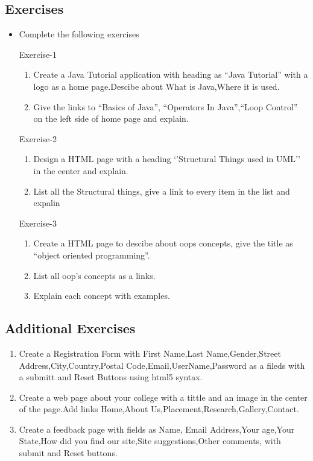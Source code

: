 \documentclass[11pt,a4paper]{article}
\begin{document}
\subsection*{Exercises}
\begin{itemize}
\item Complete the following  exercises

\item[Exercise-1]\
\begin{enumerate}[label=\bfseries Q\arabic*:]\itemsep10pt
\item Create a Java Tutorial application with heading as ``Java Tutorial'' with a logo as a home page.Descibe about What is Java,Where it is used.
\item Give the links to ``Basics of Java'', ``Operators In Java'',``Loop Control'' on the left side of home page and explain.
\end{enumerate}

\item[Exercise-2]\
\begin{enumerate}[label=\bfseries Q\arabic*:]\itemsep10pt
\item Design a HTML page with a heading `'Structural Things used in UML'' in the center and explain.
\item List all the Structural things, give a link to every item in the list and expalin 
\end{enumerate}

\item[Exercise-3]\
\begin{enumerate}[label=\bfseries Q\arabic*:]\itemsep10pt
\item Create a HTML page to descibe about oops concepts, give the title as ``object oriented programming''.
\item List all oop's concepts as a links.
\item Explain each concept with examples.
\end{enumerate}

\end{itemize}

\subsection*{Additional Exercises}
\begin{enumerate}
\item Create a Registration Form with First Name,Last Name,Gender,Street Address,City,Country,Postal Code,Email,UserName,Password as a fileds with a submitt and Reset Buttons using html5 syntax.
\item Create a web page about your college with a tittle and an image in the center of the page.Add links Home,About Us,Placement,Research,Gallery,Contact. 
\item Create a feedback page with fields as Name, Email Address,Your age,Your State,How did you find our site,Site suggestions,Other comments, with submit and Reset buttons.
\end{enumerate}
\end{document}
